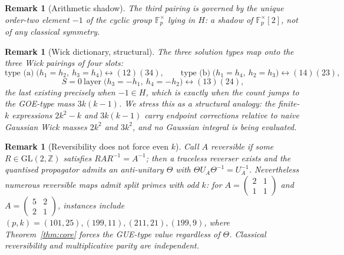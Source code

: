 \documentclass[11pt]{article}
\newtheorem{remark}[theorem]{Remark}
\begin{document}
\begin{remark}[Arithmetic shadow]\label{rem:shadow}
The third pairing is governed by the unique order-two element
$-1$ of the cyclic group $\mathbb F_p^\times$ lying in $H$: a shadow
of $\mathbb F_p^\times[2]$, not of any classical symmetry.
\end{remark}

\begin{remark}[Wick dictionary, structural]\label{rem:wickdict}
The three solution types map onto the three Wick pairings of four
slots:
\[
\text{type (a)}\;\bigl(h_1{=}h_2,\ h_3{=}h_4\bigr)
\leftrightarrow(12)(34),\qquad
\text{type (b)}\;\bigl(h_1{=}h_4,\ h_2{=}h_3\bigr)
\leftrightarrow(14)(23),
\]
\[
S=0\ \text{layer}\;\bigl(h_3{=}-h_1,\ h_4{=}-h_2\bigr)
\leftrightarrow(13)(24),
\]
the last existing precisely when $-1\in H$, which is exactly when the
count jumps to the GOE-type mass $3k(k-1)$. We stress this as a
\emph{structural analogy}: the finite-$k$ expressions $2k^2-k$ and
$3k(k-1)$ carry endpoint corrections relative to naive Gaussian Wick
masses $2k^2$ and $3k^2$, and no Gaussian integral is being evaluated.
\end{remark}

\begin{remark}[Reversibility does not force even $k$]\label{rem:rev}
Call $A$ reversible if some $R\in\mathrm{GL}(2,\mathbb Z)$ satisfies
$RAR^{-1}=A^{-1}$; then a traceless reverser exists and the quantised
propagator admits an anti-unitary $\Theta$ with
$\Theta U_A\Theta^{-1}=U_A^{-1}$.
Nevertheless numerous reversible maps admit split primes with
odd $k$: for $A=(\begin{smallmatrix}2&1\\1&1\end{smallmatrix})$ and
$A=(\begin{smallmatrix}5&2\\2&1\end{smallmatrix})$, instances include
$(p,k)=(101,25),(199,11),(211,21),(199,9)$, where
Theorem~\ref{thm:core} forces the GUE-type value regardless of
$\Theta$. Classical reversibility and multiplicative parity are
independent.
\end{remark}
\end{document}
